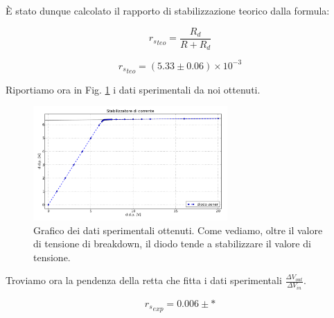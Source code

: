 


\`E stato dunque calcolato il rapporto di stabilizzazione teorico dalla formula: 

\begin{equation}
{r_s}_{teo}=\frac{R_d}{R+R_d}
\label{RS_teo}
\end{equation}

$${r_s}_{teo}= (5.33 \pm 0.06) \times 10^{-3}$$



Riportiamo ora in Fig. \ref{fig:stabilizer} i dati sperimentali da noi ottenuti.

\begin{figure}[h]
\center
	\includegraphics[width=0.66\textwidth]{stabilizer.pdf}
	\caption{Grafico dei dati sperimentali ottenuti. Come vediamo, oltre il valore di tensione di breakdown, il diodo tende a stabilizzare il valore di tensione.}
	\label{fig:stabilizer}
\end{figure}

Troviamo ora la pendenza della retta che fitta i dati sperimentali $\frac{\Delta V_{out}}{\Delta V_{in}}$.

$${r_s}_{exp}= 0.006 \pm *$$